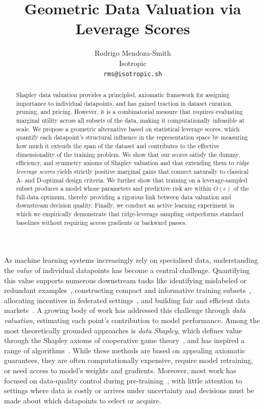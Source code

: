 \documentclass{article}
\title{Geometric Data Valuation via Leverage Scores}
\author{%
  Rodrigo Mendoza-Smith 
    \\
  Isotropic\\
  \texttt{rms@isotropic.sh}
}
\newcommand{\1}{\mathbbm{1}}
\begin{document}
\maketitle
\begin{abstract}
    Shapley data valuation provides a principled, axiomatic framework for assigning importance to individual datapoints, and has gained traction in dataset curation, pruning, and pricing.
However, it is a combinatorial measure that requires evaluating marginal utility across all subsets of the data, making it computationally infeasible at scale.
%
We propose a geometric alternative based on statistical leverage scores, which quantify each datapoint's structural influence in the representation space by measuring how much it extends the span of the dataset and contributes to the effective dimensionality of the training problem.
%
We show that our scores satisfy the dummy, efficiency, and symmetry axioms of Shapley valuation and that extending them to \emph{ridge leverage scores} yields strictly positive marginal gains that connect naturally to classical A- and D-optimal design criteria.
%
We further show that training on a leverage-sampled subset produces a model whose parameters and predictive risk are within $O(\varepsilon)$ of the full-data optimum, thereby providing a rigorous link between data valuation and downstream decision quality.
%
Finally, we conduct an active learning experiment in which we empirically demonstrate that ridge-leverage sampling outperforms standard baselines without requiring access gradients or backward passes.
%
\end{abstract}

As machine learning systems increasingly rely on specialised data, understanding the \emph{value} of individual datapoints has become a central challenge.
%
Quantifying this value supports numerous downstream tasks like identifying mislabeled or redundant examples~\cite{ghorbani2019data}, constructing compact and informative training subsets~\cite{mirzasoleiman2020coresets}, allocating incentives in federated settings~\cite{song2019profit}, and building fair and efficient data markets~\cite{agarwal2019marketplace,jia2019towards}.
%
A growing body of work has addressed this challenge through \emph{data valuation}, estimating each point’s contribution to model performance.
%
Among the most theoretically grounded approaches is \emph{data Shapley}, which defines value through the Shapley axioms of cooperative game theory~\cite{ghorbani2019data,jia2019efficient}, and has inspired a range of algorithms~\cite{jia2019efficient,kwon2023data,kwon2021beta,xu2021gradient,wang2024data}.
%
While these methods are based on appealing axiomatic guarantees, they are often computationally expensive, require model retraining, or need access to model's weights and gradients.
%
Moreover, most work has focused on data-quality control during pre-training~\cite{ghorbani2019data,jia2019efficient,koh2017understanding}, with little attention to settings where data is costly or arrives under uncertainty and decisions must be made about which datapoints to select or acquire.
\end{document}
